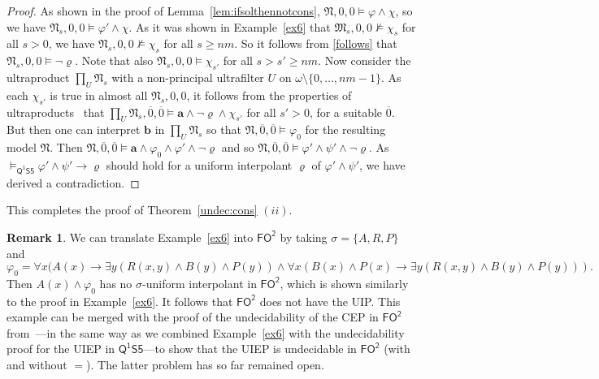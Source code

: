 \documentclass[10pt,a4paper]{amsart}
\theoremstyle{plain}
\theoremstyle{definition}
\newtheorem{rem}[thm]{Remark}
\newcommand{\FOT}{\ensuremath{\mathsf{FO^2}}}
\newcommand{\FOMS}{\ensuremath{\mathsf{Q^1S5}}}
\newcommand{\fform}[1]{\boldsymbol{#1}}
\newcommand{\pvar}{\fform{p}}
\newcommand{\avar}{\fform{a}}
\newcommand{\bvar}{\fform{b}}
\begin{document}
\begin{proof}
			As shown in the proof of Lemma~\ref{lem:ifsolthennotcons}, $\mathfrak{N},0,0\models\varphi\land\chi$, so we have $\mathfrak{N}_s,0,0\models\varphi'\land\chi$.
			As it was shown in Example~\ref{ex6} that $\mathfrak{M}_{s},0,0\not\models \chi_s$ for all $s>0$, we have 
			$\mathfrak{N}_{s},0,0\not\models \chi_s$ for all $s\geq nm$.
			So it follows from \eqref{follows} that $\mathfrak{N}_{s},0,0\models\neg \varrho$.
			Note that also $\mathfrak{N}_{s},0,0\models \chi_{s'}$ for all $s>s'\geq nm$.
			Now consider the ultraproduct $\prod_{U}\mathfrak{N}_{s}$ with a non-principal ultrafilter $U$ on $\omega\setminus\{0,\dots,nm-1\}$. 
			As each $\chi_{s'}$ is true in almost all $\mathfrak{N}_{s},0,0$, it follows from the properties of ultraproducts~\cite{modeltheory} that 
			$\prod_{U}\mathfrak{N}_{s},\overline{0},\overline{0}\models \avar \land \neg \varrho \land\chi_{s'}$ for all $s'>0$, for a suitable $\overline{0}$. But then one can interpret $\bvar$ in $\prod_{U}\mathfrak{N}_{s}$ so that  
			$\mathfrak{N},\overline{0},\overline{0}\models \varphi_{0}$ for the resulting model $\mathfrak{N}$. Then $\mathfrak{N},\overline{0},\overline{0}\models \avar \land \varphi_{0} \land \varphi' \land \neg \varrho$ and so
			$\mathfrak{N},\overline{0},\overline{0}\models\varphi'\land\psi'\land\neg\varrho$.
			As $\models_\FOMS\varphi'\land\psi'\to\varrho$ should hold for
			a uniform interpolant $\varrho$ of $\varphi'\land\psi'$, we have derived a contradiction.	
		\end{proof}
		
		This completes the proof of Theorem~\ref{undec:cons} $(ii)$.
	


\begin{rem}\label{r:FOTUIP}
We can translate Example~\ref{ex6} into \FOT{} by taking $\sigma=\{A,R,P\}$ and 
%
$$
\varphi_{0} = \forall x (A(x) \rightarrow \exists y (R(x,y) \wedge B(y) \wedge P(y)) \land{} 
 \forall x (B(x) \wedge P(x) \rightarrow \exists y (R(x,y) \wedge B(y) \wedge P(y))).
$$
%
Then $A(x) \wedge \varphi_{0}$ has no $\sigma$-uniform interpolant in \FOT{}, which is shown similarly to the proof in Example~\ref{ex6}. It follows that \FOT{} does not have the UIP.
%
This example can be merged with the proof of the undecidability of the CEP in \FOT{} from~\cite{DBLP:conf/icalp/JungLM0W17}---in the same way as we combined Example~\ref{ex6} with the undecidability proof for the UIEP in \FOMS{}---to show that the UIEP is undecidable in \FOT{} \textup{(}with and without $=$\textup{)}. The latter problem has so far remained open.
\end{rem}
\end{document}
